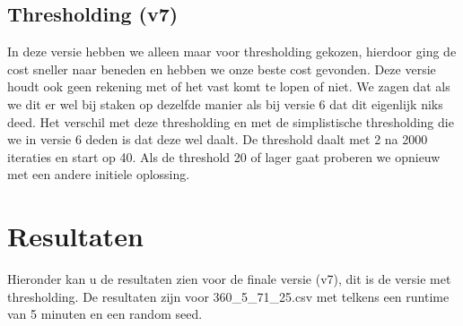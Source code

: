 \documentclass[a4paper, 11pt, one column]{article}
\begin{document}
\subsection{Thresholding (v7)}

In deze versie hebben we alleen maar voor thresholding gekozen, hierdoor ging de cost sneller naar beneden en hebben we onze beste cost gevonden.
Deze versie houdt ook geen rekening met of het vast komt te lopen of niet. We zagen dat als we dit er wel bij staken op dezelfde manier als bij versie 6 dat dit eigenlijk niks deed.
Het verschil met deze thresholding en met de simplistische thresholding die we in versie 6 deden is dat deze wel daalt. De threshold daalt met 2 na 2000 iteraties en start op 40.
Als de threshold 20 of lager gaat proberen we opnieuw met een andere initiele oplossing.

\section{Resultaten}
Hieronder kan u de resultaten zien voor de finale versie (v7), dit is de versie met thresholding. De resultaten zijn voor 360\_5\_71\_25.csv met telkens een runtime van 5 minuten en een random seed.

\begin{center}
\end{center}

\end{document}
